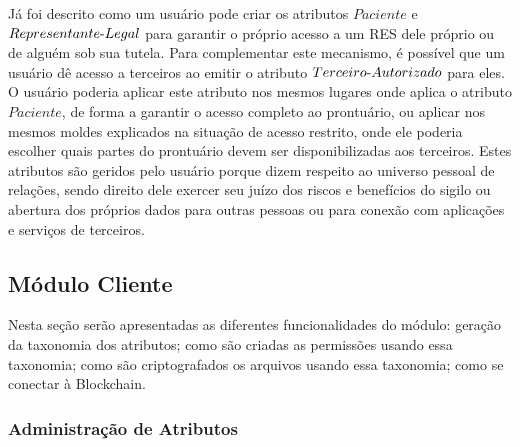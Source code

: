 \documentclass[a4paper,11pt]{article}
\begin{document}
Já foi descrito como um usuário pode criar os atributos $Paciente$ e $Representante\textnormal{-}Legal$ para garantir o próprio acesso a um RES dele próprio ou de alguém sob sua tutela. %
Para complementar este mecanismo, é possível que um usuário dê acesso a terceiros ao emitir o atributo $Terceiro\textnormal{-}Autorizado$ para eles.
O usuário poderia aplicar este atributo nos mesmos lugares onde aplica o atributo $Paciente$, de forma a garantir o acesso completo ao prontuário, ou aplicar nos mesmos moldes explicados na situação de acesso restrito, onde ele poderia escolher quais partes do prontuário devem ser disponibilizadas aos terceiros.
Estes atributos são geridos pelo usuário porque dizem respeito ao universo pessoal de relações, sendo direito dele exercer seu juízo dos riscos e benefícios do sigilo ou abertura dos próprios dados para outras pessoas ou para conexão com aplicações e serviços de terceiros.

\subsection{Módulo Cliente}

Nesta seção serão apresentadas as diferentes funcionalidades do módulo: geração da taxonomia dos atributos; como são criadas as permissões usando essa taxonomia; como são criptografados os arquivos usando essa taxonomia; como se conectar à Blockchain.

\subsubsection{Administração de Atributos}
\label{sec:sub:administracao-permissoes}
\end{document}
